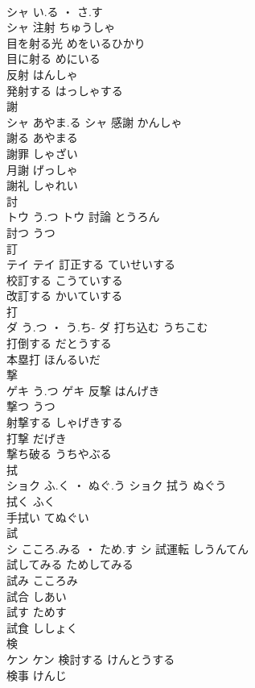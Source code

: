 \documentclass[8pt]{extreport}
\begin{document}
\begin{CJK}{UTF8}{min}
\\	シャ	い.る ・ さ.す
\\	シャ	注射	ちゅうしゃ	
\\	目を射る光	めをいるひかり	
\\	目に射る	めにいる	
\\	反射	はんしゃ	
\\	発射する	はっしゃする	
\\	謝	
\\	シャ	あやま.る	シャ	感謝	かんしゃ	
\\	謝る	あやまる	
\\	謝罪	しゃざい	
\\	月謝	げっしゃ	
\\	謝礼	しゃれい	
\\	討	
\\	トウ	う.つ	トウ	討論	とうろん	
\\	討つ	うつ	
\\	訂	
\\	テイ		テイ	訂正する	ていせいする	
\\	校訂する	こうていする	
\\	改訂する	かいていする	
\\	打	
\\	ダ	う.つ ・ う.ち-	ダ	打ち込む	うちこむ	
\\	打倒する	だとうする	
\\	本塁打	ほんるいだ	
\\	撃	
\\	ゲキ	う.つ	ゲキ	反撃	はんげき	
\\	撃つ	うつ	
\\	射撃する	しゃげきする	
\\	打撃	だげき	
\\	撃ち破る	うちやぶる	
\\	拭	
\\	ショク	ふ.く ・ ぬぐ.う	ショク	拭う	ぬぐう	
\\	拭く	ふく	
\\	手拭い	てぬぐい	
\\	試	
\\	シ	こころ.みる ・ ため.す	シ	試運転	しうんてん	
\\	試してみる	ためしてみる	
\\	試み	こころみ	
\\	試合	しあい	
\\	試す	ためす	
\\	試食	ししょく	
\\	検	
\\	ケン		ケン	検討する	けんとうする	
\\	検事	けんじ	

\end{CJK}
\end{document}
